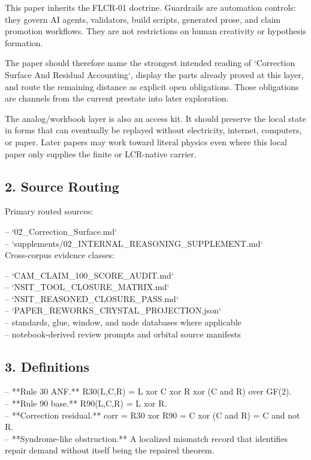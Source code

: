\documentclass[11pt]{article}
\begin{document}
This paper inherits the FLCR-01 doctrine. Guardrails are automation controls:
they govern AI agents, validators, build scripts, generated prose, and claim
promotion workflows. They are not restrictions on human creativity or
hypothesis formation.

The paper should therefore name the strongest intended reading of `Correction Surface And Residual Accounting`,
display the parts already proved at this layer, and route the remaining
distance as explicit open obligations. Those obligations are channels from the
current prestate into later exploration.

The analog/workbook layer is also an access kit. It should preserve the local
state in forms that can eventually be replayed without electricity, internet,
computers, or paper. Later papers may work toward literal physics even where
this local paper only supplies the finite or LCR-native carrier.

\subsection*{2. Source Routing}

Primary routed sources:

\noindent{}-- `02\_Correction\_Surface.md`\\
\noindent{}-- `supplements/02\_INTERNAL\_REASONING\_SUPPLEMENT.md`\\

Cross-corpus evidence classes:

\noindent{}-- `CAM\_CLAIM\_100\_SCORE\_AUDIT.md`\\
\noindent{}-- `NSIT\_TOOL\_CLOSURE\_MATRIX.md`\\
\noindent{}-- `NSIT\_REASONED\_CLOSURE\_PASS.md`\\
\noindent{}-- `PAPER\_REWORKS\_CRYSTAL\_PROJECTION.json`\\
\noindent{}-- standards, glue, window, and node databases where applicable\\
\noindent{}-- notebook-derived review prompts and orbital source manifests\\

\subsection*{3. Definitions}

\noindent{}-- **Rule 30 ANF.** R30(L,C,R) = L xor C xor R xor (C and R) over GF(2).\\
\noindent{}-- **Rule 90 base.** R90(L,C,R) = L xor R.\\
\noindent{}-- **Correction residual.** corr = R30 xor R90 = C xor (C and R) = C and not R.\\
\noindent{}-- **Syndrome-like obstruction.** A localized mismatch record that identifies repair demand without itself being the repaired theorem.\\
\end{document}
